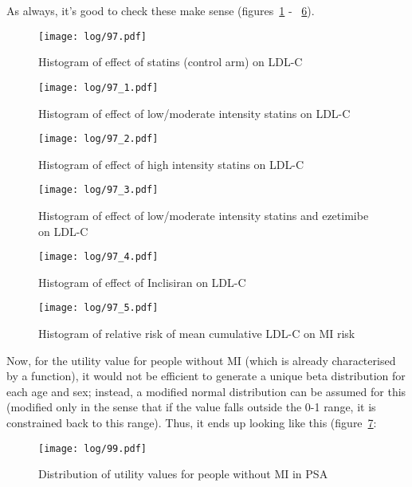 \documentclass[11pt]{article}
\begin{document}
As always, it's good to check these make sense (figures~\ref{PSAhist11} - ~\ref{PSAhist16}).

\color{Blue4}
\begin{figure}
    \centering
    \texttt{[image: log/97.pdf]}
    \caption{Histogram of effect of statins (control arm) on LDL-C}
    \label{PSAhist11}
\end{figure}
\begin{figure}
    \centering
    \texttt{[image: log/97\_1.pdf]}
    \caption{Histogram of effect of low/moderate intensity statins on LDL-C}
    \label{PSAhist12}
\end{figure}
\begin{figure}
    \centering
    \texttt{[image: log/97\_2.pdf]}
    \caption{Histogram of effect of high intensity statins on LDL-C}
    \label{PSAhist13}
\end{figure}
\begin{figure}
    \centering
    \texttt{[image: log/97\_3.pdf]}
    \caption{Histogram of effect of low/moderate intensity statins and ezetimibe on LDL-C}
    \label{PSAhist14}
\end{figure}
\begin{figure}
    \centering
    \texttt{[image: log/97\_4.pdf]}
    \caption{Histogram of effect of Inclisiran on LDL-C}
    \label{PSAhist15}
\end{figure}
\begin{figure}
    \centering
    \texttt{[image: log/97\_5.pdf]}
    \caption{Histogram of relative risk of mean cumulative LDL-C on MI risk}
    \label{PSAhist16}
\end{figure}
\begin{stlog}\end{stlog}
\color{black}

Now, for the utility value for people without MI (which is already characterised by a function), it would not be efficient to generate
a unique beta distribution for each age and sex; instead, a modified normal distribution can be assumed for this (modified only in the 
sense that if the value falls outside the 0-1 range, it is constrained back to this range). 
Thus, it ends up looking like this (figure~\ref{PSAFig4}:

\color{Blue4}
\begin{stlog}\end{stlog}
\begin{figure}
    \centering
    \texttt{[image: log/99.pdf]}
    \caption{Distribution of utility values for people without MI in PSA}
    \label{PSAFig4}
\end{figure}
\begin{stlog}\end{stlog}
\color{black}
\end{document}
